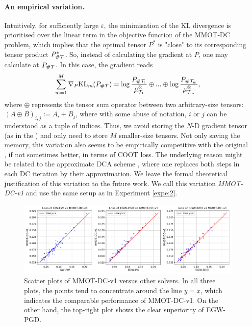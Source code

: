 \paragraph{An empirical variation.} Intuitively, for sufficiently large $\varepsilon$, the minimisation of the KL divergence is prioritised
over the linear term in the objective function of the MMOT-DC problem, which implies that the optimal tensor $P^*$ is "close" to its
corresponding tensor product $P^*_{\# \mathcal T}$. So, instead of calculating the gradient at $P$, one may calculate at
$P_{\# \mathcal T}$. In this case, the gradient reads
\begin{equation}
  \begin{split}
    \sum_{m=1}^M \nabla_P \text{KL}_m(P_{\# \mathcal T}) =
    \log \frac{P_{\# \mathcal T_1}}{\mu^{\otimes}_{\mathcal T_1}} \oplus ... \oplus \log \frac{P_{\# \mathcal T_m}}{\mu^{\otimes}_{\mathcal T_m}} ,
  \end{split}
\end{equation}
where $\oplus$ represents the tensor sum operator between two arbitrary-size tensors: $(A \oplus B)_{i,j}:= A_i + B_j$, where with some
abuse of notation, $i$ or $j$ can be understood as a tuple of indices. Thus, we avoid storing the $N$-D gradient tensor (as in the
) and only need to store $M$ smaller-size tensors. Not only saving the memory,
this variation also seems to be empirically competitive with the original , if not sometimes better,
in terms of COOT loss. The underlying reason might be related to the approximate DCA scheme \citep{Thanh15}, where one replaces both
steps in each DC iteration by their approximation. We leave the formal theoretical justification of this variation to the future work.
We call this variation \textit{MMOT-DC-v1} and use the same setup as in Experiment \ref{expe:2}.
\begin{figure}[ht]
  \centering
  \includegraphics[width=\textwidth,height=\textheight,keepaspectratio]{./Chapitre2/fig/all_vs_MMOT-DC-v1.pdf}
  \caption{Scatter plots of MMOT-DC-v1 versus other solvers. In all three plots, the points tend to concentrate around the line $y=x$,
  which indicates the comparable performance of MMOT-DC-v1. On the other hand, the top-right plot shows the clear superiority of EGW-PGD.}
  \label{fig:coot_mmot_new}
\end{figure}

